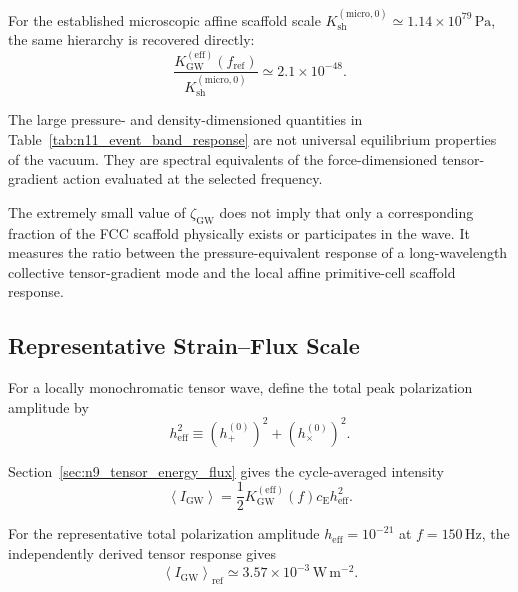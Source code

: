 For the established microscopic affine scaffold scale $K_{\mathrm{sh}}^{(\mathrm{micro},0)} \simeq 1.14\times10^{79}\,\mathrm{Pa}$, the same hierarchy is recovered directly:
\begin{equation}
    \frac{ K_{\mathrm{GW}}^{(\mathrm{eff})} \left( f_{\mathrm{ref}} \right) }{ K_{\mathrm{sh}}^{(\mathrm{micro},0)} } \simeq 2.1\times10^{-48}.
    \label{eq:n11_direct_zeta_check}
\end{equation}

The large pressure- and density-dimensioned quantities in Table~\ref{tab:n11_event_band_response} are not universal equilibrium properties of the vacuum. They are spectral equivalents of the force-dimensioned tensor-gradient action evaluated at the selected frequency.

The extremely small value of $\zeta_{\mathrm{GW}}$ does not imply that only a corresponding fraction of the FCC scaffold physically exists or participates in the wave. It measures the ratio between the pressure-equivalent response of a long-wavelength collective tensor-gradient mode and the local affine primitive-cell scaffold response.

\subsection{Representative Strain--Flux Scale}
\label{subsec:n11_strain_flux_scale}

For a locally monochromatic tensor wave, define the total peak polarization amplitude by
\begin{equation}
    h_{\mathrm{eff}}^{2} \equiv \left( h_{+}^{(0)} \right)^{2} + \left( h_{\times}^{(0)} \right)^{2}.
    \label{eq:n11_effective_polarization_amplitude}
\end{equation}

Section~\ref{sec:n9_tensor_energy_flux} gives the cycle-averaged intensity
\begin{equation}
    \left\langle I_{\mathrm{GW}} \right\rangle = \frac{1}{2} K_{\mathrm{GW}}^{(\mathrm{eff})}(f) c_{\mathrm{E}} h_{\mathrm{eff}}^{2}.
    \label{eq:n11_spectral_intensity}
\end{equation}

For the representative total polarization amplitude $h_{\mathrm{eff}} = 10^{-21}$ at $f = 150\,\mathrm{Hz}$, the independently derived tensor response gives
\begin{equation}
    \left\langle I_{\mathrm{GW}} \right\rangle_{\mathrm{ref}} \simeq 3.57\times10^{-3}\,\mathrm{W\,m^{-2}}.
    \label{eq:n11_reference_intensity}
\end{equation}

